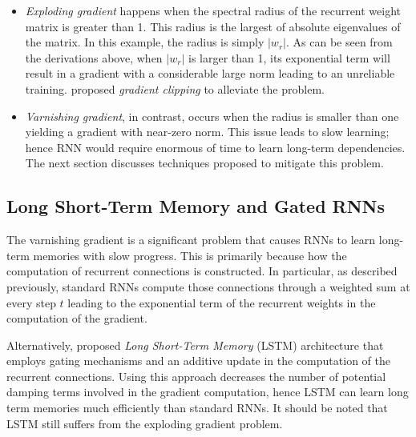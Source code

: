 %
%
%
\begin{itemize}
	\item \textit{Exploding gradient} happens when the spectral radius of the recurrent weight matrix is greater than 1. This radius is the largest of absolute eigenvalues of the matrix. In this example, the radius is simply $|w_r|$. As can be seen from the derivations above, when $|w_r|$ is larger than 1, its exponential term will result in a gradient with a considerable large norm leading to an unreliable training. \citet{Pascanudifficultytrainingrecurrent2013} proposed \textit{gradient clipping} to alleviate the problem.
	\item \textit{Varnishing gradient}, in contrast, occurs when the radius is smaller than one yielding a gradient with near-zero norm. This issue leads to slow learning; hence RNN would require enormous of time to learn long-term dependencies. The next section discusses techniques proposed to mitigate this problem.
\end{itemize}



\subsection{Long Short-Term Memory and Gated RNNs}
The varnishing gradient is a significant problem that causes RNNs to learn long-term memories with slow progress. This is primarily because how the computation of recurrent connections is constructed. In particular, as described previously, standard RNNs compute those connections through a weighted sum at every step $t$ leading to the exponential term of the recurrent weights in the computation of the gradient.

Alternatively, \citet{HochreiterLongshorttermmemory1997} proposed \textit{Long Short-Term Memory} (LSTM) architecture that employs gating mechanisms and an additive update in the computation of the recurrent connections. Using this approach  decreases the number of potential damping terms involved in the gradient computation, hence LSTM can learn long term memories much efficiently than standard RNNs. It should be noted that LSTM still suffers from the exploding gradient problem.

